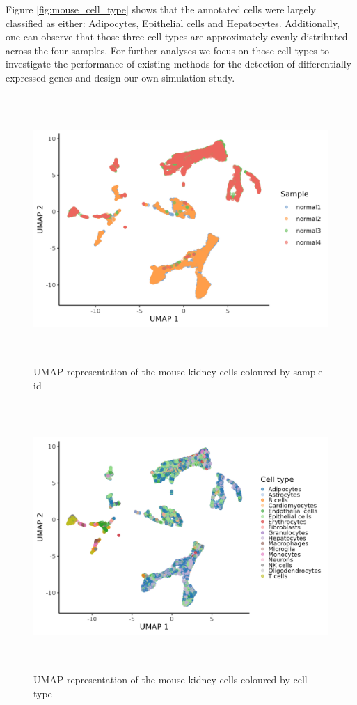 Figure \ref{fig:mouse_cell_type} shows that the annotated cells were largely classified as either: Adipocytes, Epithelial cells and Hepatocytes. Additionally, one can observe that those three cell types are approximately evenly distributed across the four samples. For further analyses we focus on those cell types to investigate the performance of existing methods for the detection of differentially expressed genes and design our own simulation study.

\begin{figure}[!htb]
\begin{center}
\includegraphics[width=6in,height=4in]{../figures/kidney_mouse/UMAP_mouse_sample_id.png}
\end{center}
\caption{UMAP representation of the mouse kidney cells coloured by sample id}
\label{fig:UMAP_mouse_sample_id}
\end{figure}

\begin{figure}[!htb]
\begin{center}
\includegraphics[width=6in,height=4in]{../figures/kidney_mouse/UMAP_mouse_cell_type.png}
\end{center}
\caption{UMAP representation of the mouse kidney cells coloured by cell type}
\label{fig:UMAP_mouse_cell_type}
\end{figure}

